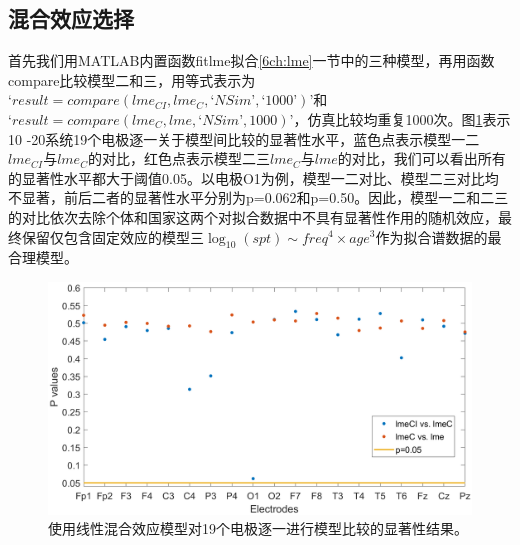 \subsection{混合效应选择}
首先我们用MATLAB内置函数fitlme拟合\ref{6ch:lme}一节中的三种模型，再用函数compare比较模型二和三，用等式表示为$‘result = compare(lme_{CI}, lme_C, ‘NSim’, ‘1000’)’$和$‘result = compare (lme_C, lme, ‘NSim’, 1000)’$，仿真比较均重复1000次。图\ref{6:pv}表示10
-20系统19个电极逐一关于模型间比较的显著性水平，蓝色点表示模型一二$lme_{CI}$与$lme_C$的对比，红色点表示模型二三$lme_C$与$lme$的对比，我们可以看出所有的显著性水平都大于阈值0.05。以电极O1为例，模型一二对比、模型二三对比均不显著，前后二者的显著性水平分别为p=0.062和p=0.50。因此，模型一二和二三的对比依次去除个体和国家这两个对拟合数据中不具有显著性作用的随机效应，最终保留仅包含固定效应的模型三$\log_{10}(spt)\sim{freq^4\times{age^3}}$作为拟合谱数据的最合理模型。
\begin{figure}[!ht]
\includegraphics[width=15cm]{pic/Norm/figure5.png}
\caption{使用线性混合效应模型对19个电极逐一进行模型比较的显著性结果。}
\label{6:pv}
\end{figure}

